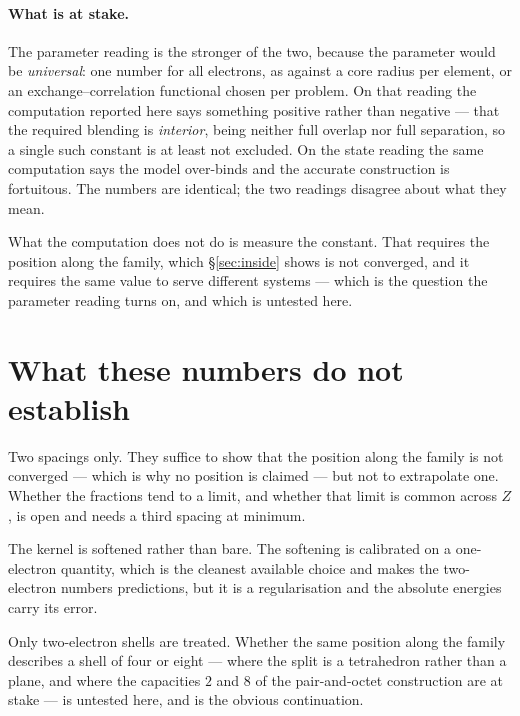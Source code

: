 \documentclass[11pt]{article}
\begin{document}
\paragraph{What is at stake.} The parameter reading is the stronger of the two, because the parameter
would be \emph{universal}: one number for all electrons, as against a core radius per element, or an
exchange--correlation functional chosen per problem. On that reading the computation reported here
says something positive rather than negative --- that the required blending is \emph{interior}, being
neither full overlap nor full separation, so a single such constant is at least not excluded. On the
state reading the same computation says the model over-binds and the accurate construction is
fortuitous. The numbers are identical; the two readings disagree about what they mean.

What the computation does not do is measure the constant. That requires the position along the family,
which \S\ref{sec:inside} shows is not converged, and it requires the same value to serve different
systems --- which is the question the parameter reading turns on, and which is untested here.

\section{What these numbers do not establish}

Two spacings only. They suffice to show that the position along the family is not converged --- which
is why no position is claimed --- but not to extrapolate one. Whether the fractions tend to a limit,
and whether that limit is common across $Z$, is open and needs a third spacing at minimum.

The kernel is softened rather than bare. The softening is calibrated on a one-electron quantity,
which is the cleanest available choice and makes the two-electron numbers predictions, but it is a
regularisation and the absolute energies carry its error.

Only two-electron shells are treated. Whether the same position along the family describes a shell of
four or eight --- where the split is a tetrahedron rather than a plane, and where the capacities $2$
and $8$ of the pair-and-octet construction are at stake --- is untested here, and is the obvious
continuation.
\end{document}

